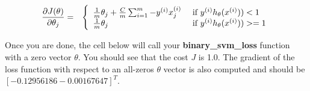 \documentclass[11pt]{article}
\begin{document}
\begin{eqnarray*} \frac{\partial J(\theta)}{\partial \theta_j}  & = &
\left \{
\begin{array}{l l}
\frac{1}{m} \theta_j + \frac{C}{m} \sum_{i=1}^{m} -y^{(i)}x_j^{(i)}& \mbox{ if } y^{(i)}h_\theta(x^{(i)})) < 1\\
\frac{1}{m} \theta_j & \mbox{ if } y^{(i)}h_\theta(x^{(i)})) >= 1\\
\end{array} \right. 
\end{eqnarray*}

Once you are done, the cell below will call your
\textbf{binary\_svm\_loss} function with a zero vector \(\theta\). You
should see that the cost \(J\) is 1.0. The gradient of the loss function
with respect to an all-zeros \(\theta\) vector is also computed and
should be \([-0.12956186 -0.00167647]^T\).
\end{document}
